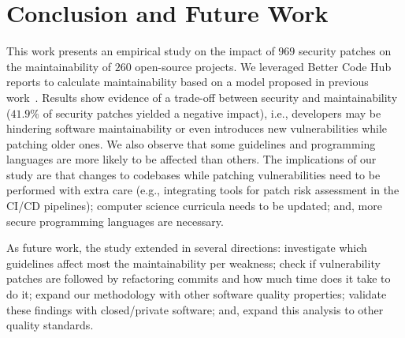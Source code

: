 \documentclass[10pt,conference]{IEEEtran}
\begin{document}
\section{Conclusion and Future Work}\label{sec:conclusions}

This work presents an empirical study on the impact of $969$ security
patches on the maintainability of $260$ open-source projects. We leveraged
Better Code Hub reports to calculate maintainability based on a model proposed in 
previous work~\cite{Olivari:2018, cruz2019energyoriented}. Results show evidence of a 
trade-off between security and maintainability ($41.9\%$ of security patches yielded a negative impact), i.e., 
developers may be hindering software maintainability or even introduces 
new vulnerabilities while patching older ones. We also observe that some guidelines 
and programming languages are more likely to be affected than others. The implications 
of our study are that changes to codebases while patching 
vulnerabilities need to be performed with extra care (e.g., integrating tools
for patch risk assessment in the CI/CD pipelines); computer science
curricula needs to be updated; and, more secure programming languages are necessary.

As future work, the study extended in several directions: 
investigate which guidelines affect most the maintainability per
weakness; check if vulnerability patches are followed by refactoring
commits and how much time does it take to do it; 
expand our methodology with other software quality properties; 
validate these findings with closed/private
software; and, expand this analysis to other quality standards.

%
%
\balance

{
  
  
}
\end{document}
